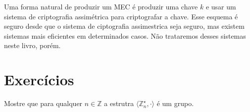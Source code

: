 Uma forma natural de produzir um MEC é produzir uma chave $k$ e usar um sistema de criptografia assimétrica para criptografar a chave.
Esse esquema é seguro desde que o sistema de ciptografia assimestrica seja seguro, mas existem sistemas mais eficientes em determinados casos.
Não trataremos desses sistemas neste livro, porém.


\section{Exercícios}
\label{sec:exercicios}


\begin{exercicio}
  \label{ex:euler}
  Mostre que para qualquer $n \in \mathbb{Z}$ a estrutra $\langle \mathbb{Z}_n^\star, \cdot \rangle$ é um grupo.
\end{exercicio}


